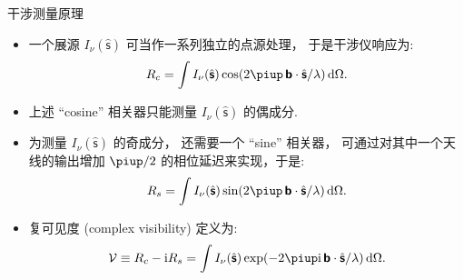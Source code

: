 \documentclass{beamer}
\newcommand{\R}[1]{\text{#1}}  %
\newcommand{\Ci}{\R{i}}  %
\newcommand{\Cpi}{\piup}  %
\newcommand{\B}[1]{\bm{\mathsf{#1}}}  %
\newcommand{\D}[1]{\R{d}#1}
\begin{document}
\begin{frame}{干涉测量原理}
  \begin{itemize}
    \item 一个展源 $I_{\nu}(\hat{\B{s}})$ 可当作一系列独立的点源处理，
      于是干涉仪响应为:
      \begin{equation}
        R_c = \int I_{\nu}(\hat{\B{s}})
          \cos (2\Cpi\, \B{b} \cdot \hat{\B{s}} / \lambda) \,\D{\Omega} .
      \end{equation}
    \item 上述 \enquote{cosine} 相关器只能测量 $I_{\nu}(\hat{\B{s}})$ 的偶成分.
    \item 为测量 $I_{\nu}(\hat{\B{s}})$ 的奇成分，
      还需要一个 \enquote{sine} 相关器，
      可通过对其中一个天线的输出增加 $\Cpi/2$ 的相位延迟来实现，于是:
      \begin{equation}
        R_s = \int I_{\nu}(\hat{\B{s}})
          \sin (2\Cpi\, \B{b} \cdot \hat{\B{s}} / \lambda) \,\D{\Omega} .
      \end{equation}
    \item \alert{复可见度 (complex visibility)} 定义为:
      \begin{equation}
        \mathcal{V}
          \equiv R_c - \Ci R_s
          = \int I_{\nu}(\hat{\B{s}})
            \exp (- 2\Cpi\Ci\, \B{b} \cdot \hat{\B{s}} / \lambda)
            \,\D{\Omega} .
      \end{equation}
  \end{itemize}
\end{frame}
\end{document}
